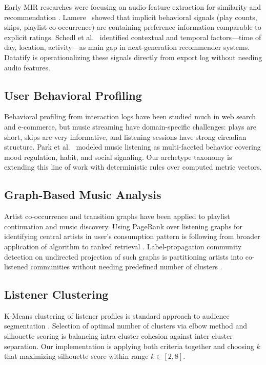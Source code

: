 \documentclass[conference]{IEEEtran}
\begin{document}
Early MIR researches were focusing on audio-feature extraction for similarity and recommendation \cite{celma2010music, knees2013survey}. Lamere~\cite{lamere2008social} showed that implicit behavioral signals (play counts, skips, playlist co-occurrence) are containing preference information comparable to explicit ratings. Schedl et al.~\cite{schedl2018challenges} identified contextual and temporal factors---time of day, location, activity---as main gap in next-generation recommender systems. Datatify is operationalizing these signals directly from export log without needing audio features.

\subsection{User Behavioral Profiling}

Behavioral profiling from interaction logs have been studied much in web search \cite{agichtein2006improving} and e-commerce, but music streaming have domain-specific challenges: plays are short, skips are very informative, and listening sessions have strong circadian structure. Park et al.~\cite{park2019multifaceted} modeled music listening as multi-faceted behavior covering mood regulation, habit, and social signaling. Our archetype taxonomy is extending this line of work with deterministic rules over computed metric vectors.

\subsection{Graph-Based Music Analysis}

Artist co-occurrence and transition graphs have been applied to playlist continuation \cite{chen2012playlist} and music discovery. Using PageRank over listening graphs for identifying central artists in user's consumption pattern is following from broader application of algorithm to ranked retrieval \cite{page1999pagerank}. Label-propagation community detection on undirected projection of such graphs is partitioning artists into co-listened communities without needing predefined number of clusters \cite{raghavan2007near}.

\subsection{Listener Clustering}

K-Means clustering of listener profiles is standard approach to audience segmentation \cite{mcqueen1967methods}. Selection of optimal number of clusters via elbow method and silhouette scoring \cite{rousseeuw1987silhouettes} is balancing intra-cluster cohesion against inter-cluster separation. Our implementation is applying both criteria together and choosing $k$ that maximizing silhouette score within range $k \in [2, 8]$.
\end{document}
